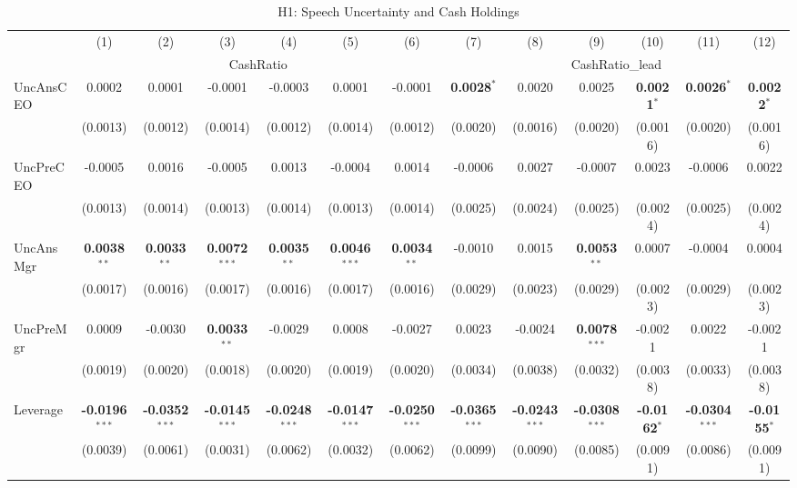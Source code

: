 \documentclass[11pt,a4paper]{article}
\begin{document}
\begin{table}[htbp]
\centering
\caption{H1: Speech Uncertainty and Cash Holdings}
\label{tab:h1}
\scriptsize
\begin{tabular}{lcccccccccccc}
\toprule
 & (1) & (2) & (3) & (4) & (5) & (6) & (7) & (8) & (9) & (10) & (11) & (12) \\
 & \multicolumn{6}{c}{CashRatio} & \multicolumn{6}{c}{CashRatio\_lead} \\
\cmidrule(lr){2-7} \cmidrule(lr){8-13}
\midrule
UncAnsCEO & 0.0002 & 0.0001 & -0.0001 & -0.0003 & 0.0001 & -0.0001 & \textbf{0.0028}$^{*}$ & 0.0020 & 0.0025 & \textbf{0.0021}$^{*}$ & \textbf{0.0026}$^{*}$ & \textbf{0.0022}$^{*}$ \\
 & (0.0013) & (0.0012) & (0.0014) & (0.0012) & (0.0014) & (0.0012) & (0.0020) & (0.0016) & (0.0020) & (0.0016) & (0.0020) & (0.0016) \\
UncPreCEO & -0.0005 & 0.0016 & -0.0005 & 0.0013 & -0.0004 & 0.0014 & -0.0006 & 0.0027 & -0.0007 & 0.0023 & -0.0006 & 0.0022 \\
 & (0.0013) & (0.0014) & (0.0013) & (0.0014) & (0.0013) & (0.0014) & (0.0025) & (0.0024) & (0.0025) & (0.0024) & (0.0025) & (0.0024) \\
UncAnsMgr & \textbf{0.0038}$^{**}$ & \textbf{0.0033}$^{**}$ & \textbf{0.0072}$^{***}$ & \textbf{0.0035}$^{**}$ & \textbf{0.0046}$^{***}$ & \textbf{0.0034}$^{**}$ & -0.0010 & 0.0015 & \textbf{0.0053}$^{**}$ & 0.0007 & -0.0004 & 0.0004 \\
 & (0.0017) & (0.0016) & (0.0017) & (0.0016) & (0.0017) & (0.0016) & (0.0029) & (0.0023) & (0.0029) & (0.0023) & (0.0029) & (0.0023) \\
UncPreMgr & 0.0009 & -0.0030 & \textbf{0.0033}$^{**}$ & -0.0029 & 0.0008 & -0.0027 & 0.0023 & -0.0024 & \textbf{0.0078}$^{***}$ & -0.0021 & 0.0022 & -0.0021 \\
 & (0.0019) & (0.0020) & (0.0018) & (0.0020) & (0.0019) & (0.0020) & (0.0034) & (0.0038) & (0.0032) & (0.0038) & (0.0033) & (0.0038) \\
\midrule
Leverage & \textbf{-0.0196}$^{***}$ & \textbf{-0.0352}$^{***}$ & \textbf{-0.0145}$^{***}$ & \textbf{-0.0248}$^{***}$ & \textbf{-0.0147}$^{***}$ & \textbf{-0.0250}$^{***}$ & \textbf{-0.0365}$^{***}$ & \textbf{-0.0243}$^{***}$ & \textbf{-0.0308}$^{***}$ & \textbf{-0.0162}$^{*}$ & \textbf{-0.0304}$^{***}$ & \textbf{-0.0155}$^{*}$ \\
 & (0.0039) & (0.0061) & (0.0031) & (0.0062) & (0.0032) & (0.0062) & (0.0099) & (0.0090) & (0.0085) & (0.0091) & (0.0086) & (0.0091) \\

\end{tabular}
\end{table}
\end{document}
